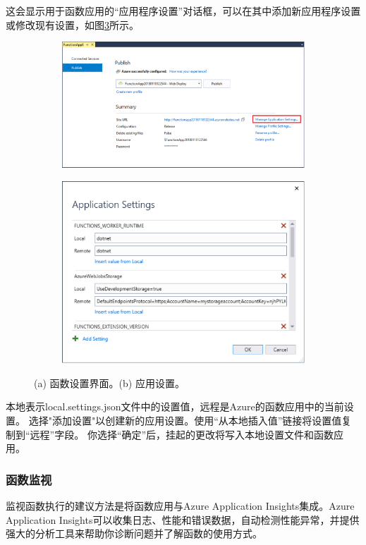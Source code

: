\documentclass[11pt]{article}
\begin{document}
这会显示用于函数应用的“应用程序设置”对话框，可以在其中添加新应用程序设置或修改现有设置，如图\ref{fig12}所示。
\begin{figure}[!htbp]
	\begin{subfigure}[b]{0.5\linewidth}
		\includegraphics[width=\linewidth]{figs/11.png}
		\caption{}
		\label{fig11}
	\end{subfigure}
	\begin{subfigure}[b]{0.5\linewidth}
		\includegraphics[width=\linewidth]{figs/12.png}
		\caption{}
		\label{fig12}
	\end{subfigure}
	\caption{(a) 函数设置界面。(b) 应用设置。}
\end{figure}

本地表示local.settings.json文件中的设置值，远程是Azure的函数应用中的当前设置。 选择"添加设置"以创建新的应用设置。使用“从本地插入值”链接将设置值复制到“远程”字段。 你选择“确定”后，挂起的更改将写入本地设置文件和函数应用。

\subsubsection{函数监视} 
监视函数执行的建议方法是将函数应用与Azure Application Insights集成。Azure Application Insights可以收集日志、性能和错误数据，自动检测性能异常，并提供强大的分析工具来帮助你诊断问题并了解函数的使用方式。
\end{document}
